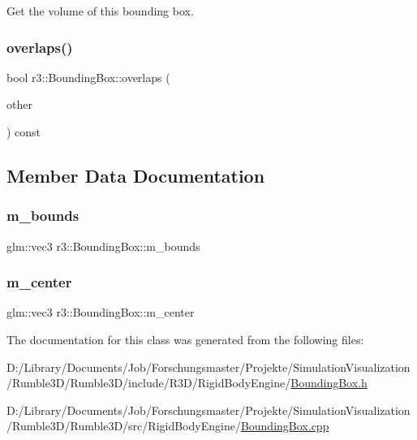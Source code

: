 Get the volume of this bounding box. \mbox{\label{classr3_1_1_bounding_box_a6e69163febe125531fa355ae9876b8be}} 
\subsubsection{\texorpdfstring{overlaps()}{overlaps()}}
{\footnotesize\ttfamily bool r3\+::\+Bounding\+Box\+::overlaps (\begin{DoxyParamCaption}\item[{const \mbox{\hyperlink{classr3_1_1_bounding_box}{Bounding\+Box}} $\ast$}]{other }\end{DoxyParamCaption}) const}



\subsection{Member Data Documentation}
\mbox{\label{classr3_1_1_bounding_box_ad23e4002c102c50ac31f6bb5da6d9d39}} 
\subsubsection{\texorpdfstring{m\+\_\+bounds}{m\_bounds}}
{\footnotesize\ttfamily glm\+::vec3 r3\+::\+Bounding\+Box\+::m\+\_\+bounds\hspace{0.3cm}{\ttfamily [protected]}}

\mbox{\label{classr3_1_1_bounding_box_ae7f47ade2f27fb7e76da58c944141d80}} 
\subsubsection{\texorpdfstring{m\+\_\+center}{m\_center}}
{\footnotesize\ttfamily glm\+::vec3 r3\+::\+Bounding\+Box\+::m\+\_\+center\hspace{0.3cm}{\ttfamily [protected]}}



The documentation for this class was generated from the following files\+:\begin{DoxyCompactItemize}
\item 
D\+:/\+Library/\+Documents/\+Job/\+Forschungsmaster/\+Projekte/\+Simulation\+Visualization/\+Rumble3\+D/\+Rumble3\+D/include/\+R3\+D/\+Rigid\+Body\+Engine/\mbox{\hyperlink{_bounding_box_8h}{Bounding\+Box.\+h}}\item 
D\+:/\+Library/\+Documents/\+Job/\+Forschungsmaster/\+Projekte/\+Simulation\+Visualization/\+Rumble3\+D/\+Rumble3\+D/src/\+Rigid\+Body\+Engine/\mbox{\hyperlink{_bounding_box_8cpp}{Bounding\+Box.\+cpp}}\end{DoxyCompactItemize}
